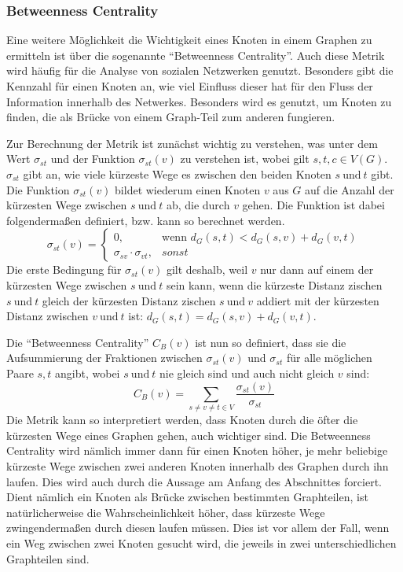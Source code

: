 \documentclass[a4paper,12pt,ngerman,chapterprefix=false,listof=totoc,bibliography=totoc]{scrreprt}
\begin{document}
\subsubsection*{Betweenness Centrality}
{
Eine weitere Möglichkeit die Wichtigkeit eines Knoten in einem Graphen zu ermitteln ist über die sogenannte "`Betweenness Centrality"'. Auch diese Metrik wird häufig für die Analyse von sozialen Netzwerken genutzt. Besonders gibt die Kennzahl für einen Knoten an, wie viel Einfluss dieser hat für den Fluss der Information innerhalb des Netwerkes. Besonders wird es genutzt, um Knoten zu finden, die als Brücke von einem Graph-Teil zum anderen fungieren. \cite{neo4j_betweenness_2020}

Zur Berechnung der Metrik ist zunächst wichtig zu verstehen, was unter dem Wert \(\sigma_{st}\) und der Funktion \(\sigma_{st}(v)\) zu verstehen ist, wobei gilt \(s,t,c \in V(G)\). \(\sigma_{st}\) gibt an, wie viele kürzeste Wege es zwischen den beiden Knoten \(s\ \text{und}\ t\) gibt. Die Funktion \(\sigma_{st}(v)\) bildet wiederum einen Knoten \(v\) aus \(G\) auf die Anzahl der kürzesten Wege zwischen \(s\ \text{und}\ t\) ab, die durch \(v\) gehen. Die Funktion ist dabei folgendermaßen definiert, bzw. kann so berechnet werden. \cite{brandes_faster_2001}
\[
	\sigma_{st}(v)=
	\begin{cases}
		0,	& \text{wenn }d_G(s,t)<d_G(s,v)+d_G(v,t)\\
		\sigma_{sv}\cdot\sigma_{vt},	& sonst
	\end{cases}
\]
Die erste Bedingung für \(\sigma_{st}(v)\) gilt deshalb, weil \(v\) nur dann auf einem der kürzesten Wege zwischen \(s\ \text{und}\ t\) sein kann, wenn die kürzeste Distanz zischen \(s\ \text{und}\ t\) gleich der kürzesten Distanz zischen \(s\ \text{und}\ v\) addiert mit der kürzesten Distanz zwischen \(v\ \text{und}\ t\) ist: \(d_G(s,t)=d_G(s,v)+d_G(v,t)\).

Die "`Betweenness Centrality"' \(C_B(v)\) ist nun so definiert, dass sie die Aufsummierung der Fraktionen zwischen \(\sigma_{st}(v)\) und \(\sigma_{st}\) für alle möglichen Paare \(s,t\) angibt, wobei \(s\ \text{und}\ t\) nie gleich sind und auch nicht gleich \(v\) sind:
\[
	C_B(v)=\sum_{s\neq v\neq t\in V}\frac{\sigma_{st}(v)}{\sigma_{st}}
\]
Die Metrik kann so interpretiert werden, dass Knoten durch die öfter die kürzesten Wege eines Graphen gehen, auch wichtiger sind. Die Betweenness Centrality wird nämlich immer dann für einen Knoten höher, je mehr beliebige kürzeste Wege zwischen zwei anderen Knoten innerhalb des Graphen durch ihn laufen. Dies wird auch durch die Aussage am Anfang des Abschnittes forciert. Dient nämlich ein Knoten als Brücke zwischen bestimmten Graphteilen, ist natürlicherweise die Wahrscheinlichkeit höher, dass kürzeste Wege zwingendermaßen durch diesen laufen müssen. Dies ist vor allem der Fall, wenn ein Weg zwischen zwei Knoten gesucht wird, die jeweils in zwei unterschiedlichen Graphteilen sind.

}
\end{document}
